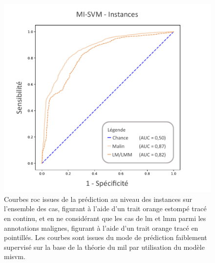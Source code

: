\begin{figure}[H]
    \centering
    \includegraphics[width=0.8\linewidth]{contents/chapter_7/resources/results_lesion_roc_instances.pdf}
    \caption{Courbes \gls{roc} issues de la prédiction au niveau des instances sur l'ensemble des cas, figurant à l'aide d'un trait orange estompé tracé en continu, et en ne considérant que les cas de \gls{lm} et \gls{lmm} parmi les annotations malignes, figurant à l'aide d'un trait orange tracé en pointillés. Les courbes sont issues du mode de prédiction faiblement supervisé sur la base de la théorie du \gls{mil} par utilisation du modèle \gls{misvm}.}
    \label{fig:results_lesion_roc_instances}
\end{figure}\par
\clearpage

